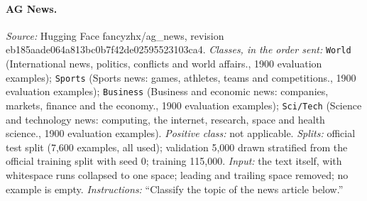 \paragraph{AG News.} \emph{Source:} Hugging Face fancyzhx/\allowbreak{}ag\_news, revision eb185aad\allowbreak{}e064a813\allowbreak{}bc0b7f42\allowbreak{}de025955\allowbreak{}23103ca4. \emph{Classes, in the order sent:} \texttt{World} (International news, politics, conflicts and world affairs., 1900 evaluation examples); \texttt{Sports} (Sports news: games, athletes, teams and competitions., 1900 evaluation examples); \texttt{Business} (Business and economic news: companies, markets, finance and the economy., 1900 evaluation examples); \texttt{Sci/Tech} (Science and technology news: computing, the internet, research, space and health science., 1900 evaluation examples). \emph{Positive class:} not applicable. \emph{Splits:} official test split (7{,}600 examples, all used); validation 5{,}000 drawn stratified from the official training split with seed 0; training 115{,}000. \emph{Input:} the text itself, with whitespace runs collapsed to one space; leading and trailing space removed; no example is empty. \emph{Instructions:} ``Classify the topic of the news article below.''
